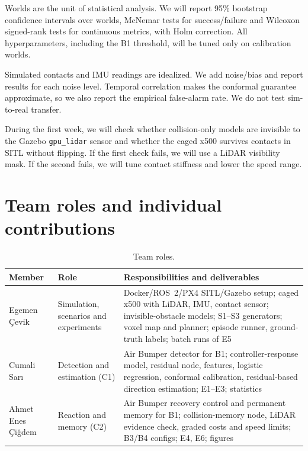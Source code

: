 \documentclass[conference,10pt]{IEEEtran}
\begin{document}
Worlds are the unit of statistical analysis. We will report 95\% bootstrap confidence intervals over worlds, McNemar tests for success/failure and Wilcoxon signed-rank tests for continuous metrics, with Holm correction. All hyperparameters, including the B1 threshold, will be tuned only on calibration worlds.

Simulated contacts and IMU readings are idealized. We add noise/bias and report results for each noise level. Temporal correlation makes the conformal guarantee approximate, so we also report the empirical false-alarm rate. We do not test sim-to-real transfer.

During the first week, we will check whether collision-only models are invisible to the Gazebo \texttt{gpu\_lidar} sensor and whether the caged x500 survives contacts in SITL without flipping. If the first check fails, we will use a LiDAR visibility mask. If the second fails, we will tune contact stiffness and lower the speed range.

\section{Team roles and individual contributions}

\begin{table}[!h]
\caption{Team roles.}
\label{tab:team}
\footnotesize
\begin{tabularx}{\columnwidth}{@{}L{1.35cm}L{1.6cm}Y@{}}
\toprule
\textbf{Member} & \textbf{Role} & \textbf{Responsibilities and deliverables}\\
\midrule
Egemen Çevik & Simulation, scenarios and experiments & Docker/ROS~2/PX4 SITL/Gazebo setup; caged x500 with LiDAR, IMU, contact sensor; invisible-obstacle models; S1--S3 generators; voxel map and planner; episode runner, ground-truth labels; batch runs of E5\\
Cumali Sarı & Detection and estimation (C1) & Air Bumper detector for B1; controller-response model, residual node, features, logistic regression, conformal calibration, residual-based direction estimation; E1--E3; statistics\\
Ahmet Enes Çiğdem & Reaction and memory (C2) & Air Bumper recovery control and permanent memory for B1; collision-memory node, LiDAR evidence check, graded costs and speed limits; B3/B4 configs; E4, E6; figures\\
\bottomrule
\end{tabularx}
\end{table}
\end{document}
